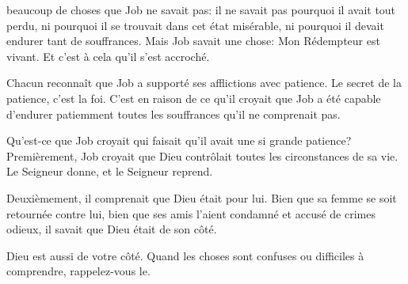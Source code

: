 \dvrule






 beaucoup de choses que Job ne savait pas\space:
 il ne savait pas pourquoi il avait tout perdu, ni pourquoi
 il se trouvait dans cet état misérable,
 ni pourquoi il devait endurer tant de souffrances.
 Mais Job savait une chose\space: \og Mon Rédempteur est vivant. \fg{}
 Et c'est à cela qu'il s'est accroché. 

Chacun reconnaît que Job a supporté ses afflictions avec patience.
 Le secret de la patience, c'est la foi. C'est en raison de ce qu'il croyait
 que Job a été capable d'endurer patiemment toutes les souffrances
 qu'il ne comprenait pas. 


Qu'est-ce que Job croyait qui faisait qu'il avait une si grande patience?
 Premièrement, Job croyait que Dieu contrôlait toutes les circonstances
 de sa vie. Le Seigneur donne, et le Seigneur reprend. 

Deuxièmement, il comprenait que Dieu était pour lui.
 Bien que sa femme se soit retournée contre lui,
 bien que ses amis l'aient condamné et accusé de crimes odieux,
 il savait que Dieu était de son côté. 

Dieu est aussi de votre côté.
 Quand les choses sont confuses ou difficiles à comprendre, rappelez-vous le.

\dvrule



